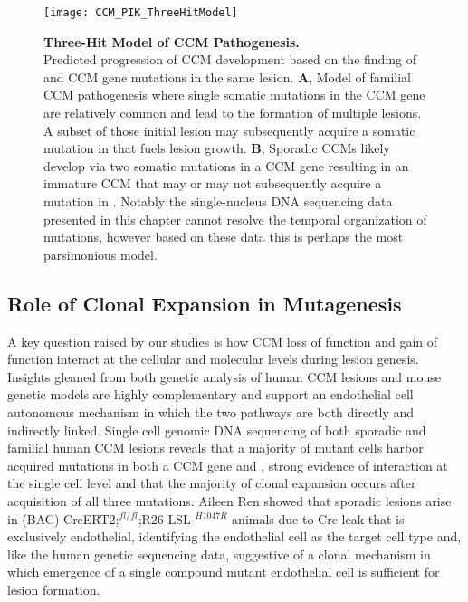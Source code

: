 \begin{figure}[tbp!]
\begin{center}
\texttt{[image: CCM\_PIK\_ThreeHitModel]}
\end{center}
\caption[Three-Hit Model of CCM Pathogenesis] {\textbf{Three-Hit Model of CCM Pathogenesis.} \\ Predicted progression of CCM development based on the finding of  and CCM gene mutations in the same lesion. \textbf{A}, Model of familial CCM pathogenesis where single somatic mutations in the CCM gene are relatively common and lead to the formation of multiple lesions. A subset of those initial lesion may subsequently acquire a somatic mutation in  that fuels lesion growth. \textbf{B}, Sporadic CCMs likely develop via two somatic mutations in a CCM gene resulting in an immature CCM that may or may not subsequently acquire a mutation in . Notably the single-nucleus DNA sequencing data presented in this chapter cannot resolve the temporal organization of mutations, however based on these data this is perhaps the most parsimonious model. }

\label{CCM_PIK_ThreeHitModel}
\end{figure}

\subsection{Role of Clonal Expansion in Mutagenesis}
A key question raised by our studies is how CCM loss of function and  gain of function interact at the cellular and molecular levels during lesion genesis. Insights gleaned from both genetic analysis of human CCM lesions and mouse genetic models are highly complementary and support an endothelial cell autonomous mechanism in which the two pathways are both directly and indirectly linked. Single cell genomic DNA sequencing of both sporadic and familial human CCM lesions reveals that a majority of mutant cells harbor acquired mutations in both a CCM gene and , strong evidence of interaction at the single cell level and that the majority of clonal expansion occurs after acquisition of all three mutations. Aileen Ren showed that sporadic lesions arise in (BAC)-CreERT2;$^{fl/fl}$;R26-LSL-$^{H1047R}$ animals due to Cre leak that is exclusively endothelial, identifying the endothelial cell as the target cell type and, like the human genetic sequencing data, suggestive of a clonal mechanism in which emergence of a single compound mutant endothelial cell is sufficient for lesion formation.

